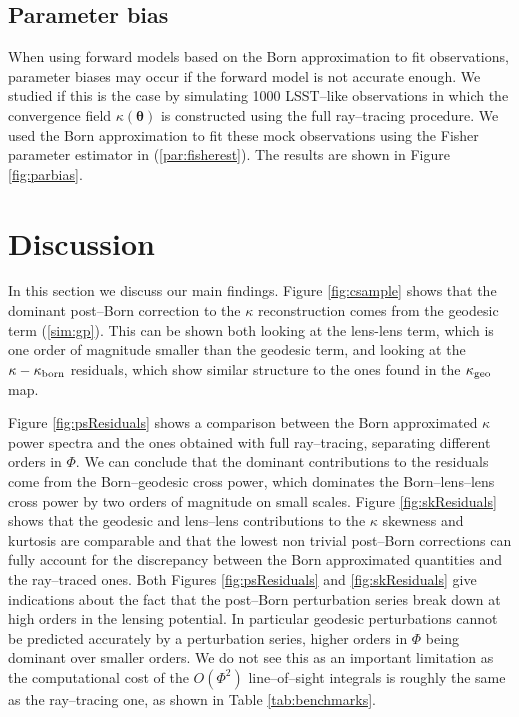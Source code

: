 \documentclass[reprint,aps,prd,superscriptaddress,showkeys,showpacs]{revtex4-1}
\newcommand\pt{\pmb{\theta}}
\begin{document}
\subsection{Parameter bias}
When using forward models based on the Born approximation to fit observations, parameter biases may occur if the forward model is not accurate enough. We studied if this is the case by simulating 1000 LSST--like observations in which the convergence field $\kappa(\pt)$ is constructed using the full ray--tracing procedure. We used the Born approximation to fit these mock observations using the Fisher parameter estimator in (\ref{par:fisherest}). The results are shown in Figure \ref{fig:parbias}.  


\section{Discussion}
% 
In this section we discuss our main findings. Figure \ref{fig:csample} shows that the dominant post--Born correction to the $\kappa$ reconstruction comes from the geodesic term (\ref{sim:gp}). This can be shown both looking at the lens-lens term, which is one order of magnitude smaller than the geodesic term, and looking at the $\kappa-\kappa_{\rm born}$ residuals, which show similar structure to the ones found in the $\kappa_{\rm geo}$ map. 

Figure \ref{fig:psResiduals} shows a comparison between the Born approximated $\kappa$ power spectra and the ones obtained with full ray--tracing, separating different orders in $\Phi$. We can conclude that the dominant contributions to the residuals come from the Born--geodesic cross power, which dominates the Born--lens--lens cross power by two orders of magnitude on small scales. Figure \ref{fig:skResiduals} shows that the geodesic and lens--lens contributions to the $\kappa$ skewness and kurtosis are comparable and that the lowest non trivial post--Born corrections can fully account for the discrepancy between the Born approximated quantities and the ray--traced ones.  Both Figures \ref{fig:psResiduals} and \ref{fig:skResiduals} give indications about the fact that the post--Born perturbation series break down at high orders in the lensing potential. In particular geodesic perturbations cannot be predicted accurately by a perturbation series, higher orders in $\Phi$ being dominant over smaller orders. We do not see this as an important limitation as the computational cost of the $O(\Phi^2)$ line--of--sight integrals is roughly the same as the ray--tracing one, as shown in Table \ref{tab:benchmarks}.  
\end{document}
